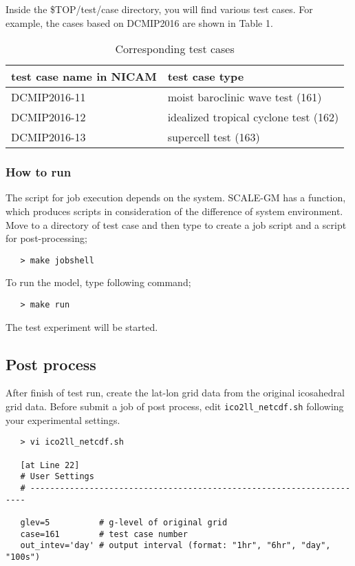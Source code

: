 \noindent Inside the \${TOP}/test/case directory, you will find various test cases.
For example, the cases based on DCMIP2016 are shown in Table 1.

 \begin{table}[b]
 \begin{center}
 \caption{Corresponding test cases}
 \begin{tabularx}{150mm}{|l|X|} \hline
 \rowcolor[gray]{0.9} test case name in NICAM & test case type \\ \hline
  DCMIP2016-11 & moist baroclinic wave test (161)       \\ \hline
  DCMIP2016-12 & idealized tropical cyclone test (162)  \\ \hline
  DCMIP2016-13 & supercell test (163)                   \\ \hline
 \end{tabularx}
 \end{center}
 \end{table}


\subsubsection{How to run}

The script for job execution depends on the system.
SCALE-GM has a function, which produces scripts in consideration
of the difference of system environment.
Move to a directory of test case and then type
to create a job script and a script for post-processing;

 \begin{verbatim}
   > make jobshell
 \end{verbatim}

To run the model, type following command;

 \begin{verbatim}
   > make run
 \end{verbatim}

The test experiment will be started.

\subsection{Post process}
 After finish of test run, create the lat-lon grid data from
 the original icosahedral grid data.
 Before submit a job of post process, edit \verb|ico2ll_netcdf.sh|
 following your experimental settings.
 \begin{verbatim}
   > vi ico2ll_netcdf.sh

   [at Line 22]
   # User Settings
   # ---------------------------------------------------------------------

   glev=5          # g-level of original grid
   case=161        # test case number
   out_intev='day' # output interval (format: "1hr", "6hr", "day", "100s")
 \end{verbatim}

